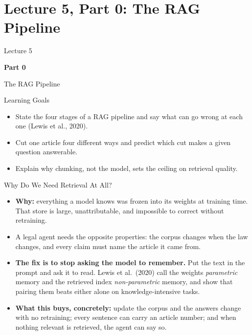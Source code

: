 \section{Lecture 5, Part 0: The RAG Pipeline}

\begin{frame}
\vfill
\centering
{\color{RLBlue}\large Lecture 5}

\vspace{0.3em}
{\color{RLBlue}\Large\bfseries Part 0}

\vspace{0.6em}
{\Large The RAG Pipeline}
\vfill
\end{frame}

\begin{frame}{Learning Goals}
\begin{itemize}
  \item State the four stages of a RAG pipeline and say what can go wrong at each one (Lewis et al., 2020).
  \pause
  \item Cut one article four different ways and predict which cut makes a given question answerable.
  \pause
  \item Explain why chunking, not the model, sets the ceiling on retrieval quality.
\end{itemize}
\end{frame}

\begin{frame}{Why Do We Need Retrieval At All?}
\begin{itemize}
  \item \textbf{Why:} everything a model knows was frozen into its weights at training time. That store is large, unattributable, and impossible to correct without retraining.
  \pause
  \item A legal agent needs the opposite properties: the corpus changes when the law changes, and every claim must name the article it came from.
  \pause
  \item \textbf{The fix is to stop asking the model to remember.} Put the text in the prompt and ask it to read. Lewis et al.\ (2020) call the weights \emph{parametric} memory and the retrieved index \emph{non-parametric} memory, and show that pairing them beats either alone on knowledge-intensive tasks.
  \pause
  \item \textbf{What this buys, concretely:} update the corpus and the answers change with no retraining; every sentence can carry an article number; and when nothing relevant is retrieved, the agent can say so.
\end{itemize}
\end{frame}

